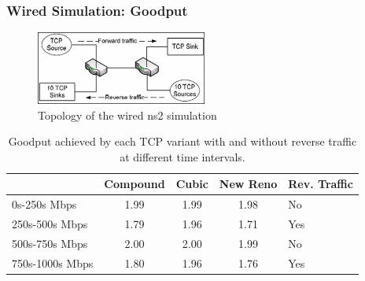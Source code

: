 \documentclass{beamer}
\begin{document}
\begin{frame}
\frametitle{Wired Simulation: Goodput}


\begin{figure}
	\includegraphics[width=0.5\textwidth]{images/abdeljaouad10_topology_1.png}
	\caption{Topology of the wired ns2 simulation}
\end{figure}

\begin{table}
\small
\begin{tabular}{l*{3}{c}l}
& Compound & Cubic & New Reno & Rev. Traffic \\
\hline
0s-250s Mbps & 1.99 & 1.99 & 1.98 & No \\
250s-500s Mbps & 1.79 & 1.96 & 1.71 & Yes \\
500s-750s Mbps & 2.00 & 2.00 & 1.99 & No \\
750s-1000s Mbps & 1.80 & 1.96 & 1.76 & Yes \\
\end{tabular}
\caption{Goodput achieved by each TCP variant with and without reverse traffic at different time intervals.}
\end{table}

\end{frame}
\end{document}
